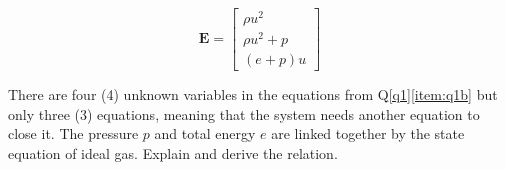 \begin{equation}	
	\textbf{E} = \begin{bmatrix}
\rho u^2 \\ \rho u^2 + p \\ (e+p)u
\end{bmatrix}	\nonumber
	\end{equation}
		
		

\item There are four (4) unknown variables in the equations from Q\ref{q1}\ref{item:q1b} but only three (3) equations, meaning that the system needs another equation to close it. The pressure $p$ and total energy $e$ are linked together by the state equation of ideal gas. Explain and derive the relation.

		
\listclose %

